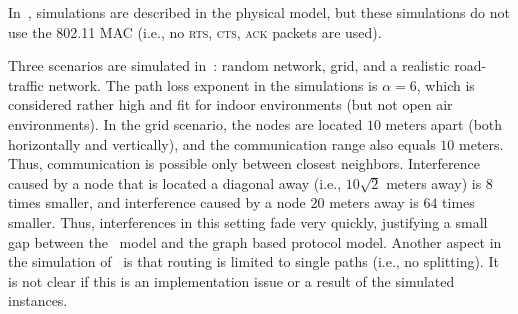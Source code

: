 \documentclass[12pt]{article}
\newenvironment{proof sketch}[1]{\noindent {\emph{Proof sketch of #1:}}}{\hfill \qed}
\newcommand{\SINR}{\text{\sc{sinr}}}
\begin{document}
In~\cite{chafekarPhD}, simulations are described in the physical
model, but these simulations do not use the 802.11 MAC (i.e., no
\textsc{rts, cts, ack} packets are used).

Three scenarios are simulated in~\cite{chafekarPhD}: random network,
grid, and a realistic road-traffic network. The path loss exponent in
the simulations is $\alpha=6$, which is considered rather high and fit
for indoor environments (but not open air environments). In the grid
scenario, the nodes are located $10$ meters apart (both horizontally
and vertically), and the communication range also equals $10$ meters.
Thus, communication is possible only between closest neighbors.
Interference caused by a node that is located a diagonal away (i.e., $10\sqrt{2}$
meters away) is $8$ times smaller, and interference caused by a node
$20$ meters away is $64$ times smaller. Thus, interferences in this
setting fade very quickly, justifying a small gap between the \SINR\
model and the graph based protocol model. Another aspect in the
simulation of~\cite{chafekarPhD} is that routing is limited to single
paths (i.e., no splitting). It is not clear if this is an
implementation issue or a result of the simulated instances.
\end{document}
